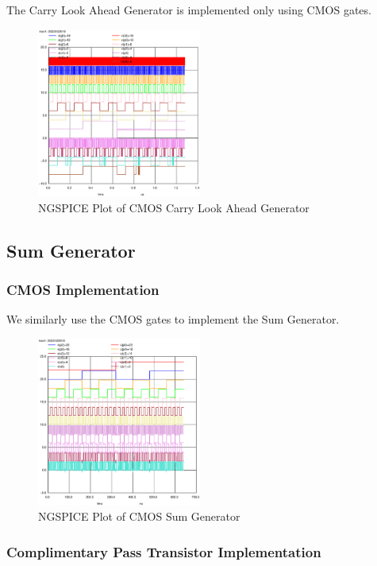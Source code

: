 \documentclass[conference]{IEEEtran}
\begin{document}
The Carry Look Ahead Generator is implemented only using CMOS gates.

\begin{figure}[H]
    \centering
    \includegraphics[width=0.48\textwidth]{images/cla_gen_cmos_tran.eps}
    \caption{NGSPICE Plot of CMOS Carry Look Ahead Generator}
\end{figure}

\subsection{Sum Generator}

\subsubsection{CMOS Implementation}

We similarly use the CMOS gates to implement the Sum Generator.

\begin{figure}[H]
    \centering
    \includegraphics[width=0.48\textwidth]{images/sum_gen_cmos_tran.eps}
    \caption{NGSPICE Plot of CMOS Sum Generator}
\end{figure}

\subsubsection{Complimentary Pass Transistor Implementation}
\end{document}
